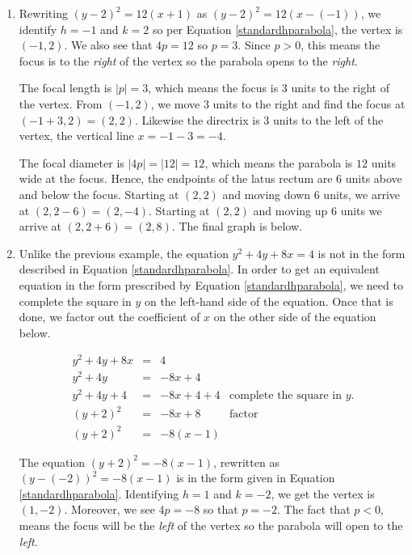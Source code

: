 \documentclass{ximera}
\begin{document}
\begin{example}
\begin{explanation}
\begin{enumerate}
\begin{enumerate}
\item  Rewriting $(y-2)^2 = 12(x+1)$ as $(y-2)^2 = 12(x-(-1))$, we identify $h=-1$ and $k=2$ so per  Equation \ref{standardhparabola}, the vertex is $(-1,2)$.  We also see that $4p = 12$ so $p = 3$.  Since $p>0$, this means the focus is to the \textit{right} of the vertex so the parabola opens to the \textit{right}.


 

The focal length is $|p| = 3$, which means the focus is $3$ units to the right of the vertex.  From $(-1,2)$, we move  $3$ units to the right and find the focus at $(-1+3,2) = (2,2)$.  Likewise the directrix is $3$ units to the left of the vertex, the vertical  line $x=-1-3 = -4$.  


 

The focal diameter is $|4p| = |12| = 12$, which means the parabola is $12$ units wide at the focus.  Hence, the endpoints of the latus rectum are $6$ units above and below  the focus.  Starting at $(2,2)$ and moving down $6$ units, we arrive at $(2,2-6) = (2,-4)$.  Starting at $(2,2)$ and moving up  $6$ units we arrive at $(2,2+6) = (2,8)$.  The final graph is below.

\begin{center}
\end{center}

\item  Unlike the previous example, the equation  $y^2 + 4y + 8x = 4$ is not in the form described  in Equation \ref{standardhparabola}.  In order to get an equivalent equation in the form prescribed by  Equation \ref{standardhparabola}, we need to complete the square in $y$  on the left-hand side of the equation.  Once that is done, we  factor out the coefficient of $x$ on the other side of the equation below.

\[ \begin{array}{rclr} y^2+4y+8x &  = & 4 & \\
y^2 + 4y &  = & -8x + 4 &  \\
y^2+4y+4 & = & -8x+4+4 & \mbox{complete the square in $y$.} \\
(y+2)^2 & = &-8x+8 & \mbox{factor}  \\ 
(y+2)^2 & = & -8(x-1) &   \end{array} \]

The equation $(y+2)^2 = -8(x-1)$, rewritten as $(y-(-2))^2 = -8(x-1)$ is in the form given in Equation \ref{standardhparabola}.  Identifying  $h = 1$ and $k = -2$, we get the vertex is $(1,-2)$.  Moreover, we see $4p = -8$ so that $p = -2$.  The fact that $p < 0$, means the focus will be the \textit{left} of the vertex so the parabola will open to the \textit{left}.  



\end{enumerate}
\end{enumerate}
\end{explanation}
\end{example}
\end{document}
